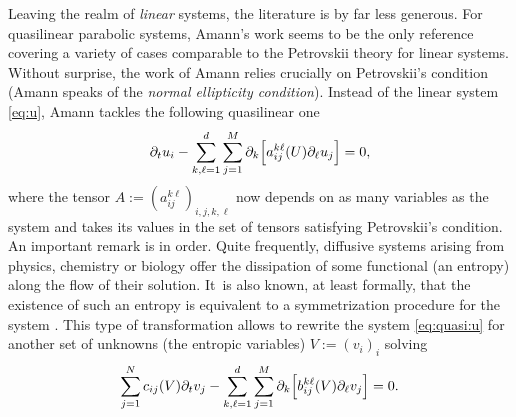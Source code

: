 \documentclass[JEP,XML,SOM,Unicode,published]{cedram}
\theoremstyle{definition}
\begin{document}
Leaving the realm of \emph{linear} systems, the literature is by far less generous. For quasilinear parabolic systems, Amann's work \cite{amann} seems to be the only reference covering a variety of cases comparable to the Petrovskii theory for linear systems. Without surprise, the work of Amann relies crucially on Petrovskii's condition (Amann speaks of the \emph{normal ellipticity condition}). Instead of the linear system \eqref{eq:u}, Amann tackles the following quasilinear one\vspace*{-3pt}\enlargethispage{.5\baselineskip}
\begin{align}\label{eq:quasi:u}
\partial_t u_i - \sum_{k,\ell=1}^d\sum_{j=1}^M \partial_k \Bigl[a_{ij}^{k\ell}(U) \partial_\ell u_j \Bigr] = 0,
\end{align}
where the tensor $A:=(a_{ij}^{k\ell})_{i,j,k,\ell}$ now depends on as many variables as the system and takes its values in the set of tensors satisfying Petrovskii's condition. An important remark is in order. Quite frequently, diffusive systems arising from physics, chemistry or biology offer the dissipation of some functional (an entropy) along the flow of their solution. It~is also known, at least formally, that the existence of such an entropy is equivalent to a symmetrization procedure for the system \cite{degond,kawashizu,kawa}. This type of transformation allows to rewrite the system \eqref{eq:quasi:u} for another set of unknowns (the entropic variables) $V:=(v_i)_i$ solving\vspace*{-3pt}
\begin{align}\label{eq:u:symm}
\sum_{j=1}^N c_{ij}(V) \partial_t v_j - \sum_{k,\ell=1}^d\sum_{j=1}^M \partial_k \Bigl[b_{ij}^{k\ell}(V) \partial_\ell v_j \Bigr] = 0.
\end{align}
\end{document}

